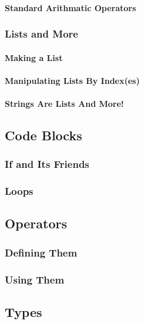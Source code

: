 \documentclass{article}
\begin{document}
\paragraph{Standard Arithmatic Operators}

\subsubsection{Lists and More}
\paragraph{Making a List}

\paragraph{Manipulating Lists By Index(es)}

\paragraph{Strings Are Lists And More!}

\subsection{Code Blocks}
\subsubsection{If and Its Friends}

\subsubsection{Loops}

\subsection{Operators} \label{subsec:Operators}
\subsubsection{Defining Them}

\subsubsection{Using Them}

\subsection{Types}
\end{document}
